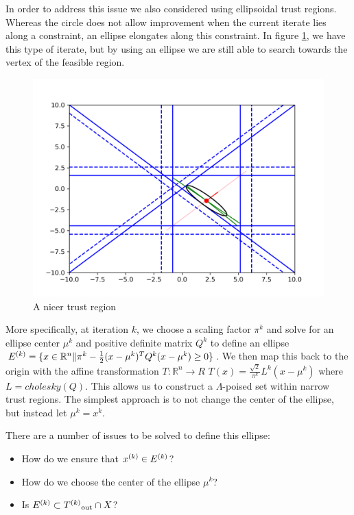 In order to address this issue we also considered using ellipsoidal trust regions.
Whereas the circle does not allow improvement when the current iterate lies along a constraint, an ellipse elongates along this constraint.
In figure \cref{ellipse_adv}, we have this type of iterate, but by using an ellipse we are still able to search towards the vertex of the feasible region.
\begin{figure}[h]
    \centering
    \includegraphics[scale=0.4]{images/advantage_of_ellipse_2.png}
    \caption{A nicer trust region}
    \label{ellipse_adv}
\end{figure}


More specifically, at iteration $k$, we choose a scaling factor $\pi^k$ and solve for an ellipse center $\mu^k$ and positive definite matrix $Q^k$ to define an ellipse
$ {E^{(k)}} = \{x \in \mathbb R^n \| \pi^k - \frac 1 2 (x - \mu^{k})^TQ^{k}(x - \mu^{k}) \ge 0 \}$.
We then map this back to the origin with the affine transformation $T : \mathbb R^n \to R$ $T(x) = \frac {\sqrt{2}}{\pi^k} L^k(x-\mu^k)$ where $L = cholesky(Q)$.
This allows us to construct a $\Lambda$-poised set within narrow trust regions.
The simplest approach is to not change the center of the ellipse, but instead let $\mu^k = x^k$.

There are a number of issues to be solved to define this ellipse:
\begin{itemize}
\item How do we ensure that ${x}^{(k)} \in {E^{(k)}}$?
\item How do we choose the center of the ellipse $\mu^k$?
\item Is $ {E^{(k)}} \subset {T^{(k)}}_{\text{out}} \cap X$?
\end{itemize}

